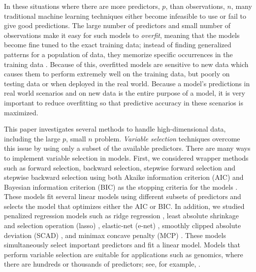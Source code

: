 \documentclass{article}
\begin{document}
	In these situations where there are more predictors, $p$, than observations, $n$, many traditional machine learning techniques either become infeasible to use or fail to give good predictions. The large number of predictors and small number of observations make it easy for such models to \textit{overfit}, meaning that the models become fine tuned to the exact training data; instead of finding generalized patterns for a population of data, they memorize specific occurrences in the training data \cite{james2013introduction, friedman2001elements}. Because of this, overfitted models are sensitive to new data which causes them to perform extremely well on the training data, but poorly on testing data or when deployed in the real world. Because a model's predictions in real world scenarios and on new data is the entire purpose of a model, it is very important to reduce overfitting so that predictive accuracy in these scenarios is maximized.
	
	
	This paper investigates several methods to handle high-dimensional data, including the large $p$, small $n$ problem. \textit{Variable selection} techniques overcome this issue by using only a subset of the available predictors. There are many ways to implement variable selection in models. First, we considered wrapper methods such as forward selection, backward selection, stepwise forward selection and stepwise backward selection using both Akaike information criterion (AIC) and Bayesian information criterion (BIC) as the stopping criteria for the models \cite{akaike1998information, schwarz1978estimating}. These models fit several linear models using different subsets of predictors and selects the model that optimizes either the AIC or BIC. In addition, we studied penalized regression models such as ridge regression \cite{hoerl1970ridge}, least absolute shrinkage and selection operation (lasso) \cite{tibshirani1996regression}, elastic-net (e-net) \cite{zou2005regularization}, smoothly clipped absolute deviation (SCAD) \cite{fan2001variable}, and minimax concave penalty (MCP) \cite{zhang2010nearly}. These models simultaneously select important predictors and fit a linear model. Models that perform variable selection are suitable for applications such as genomics, where there are hundreds or thousands of predictors; see, for example, \cite{usai2009lasso, li2012overview}.
	
\end{document}
